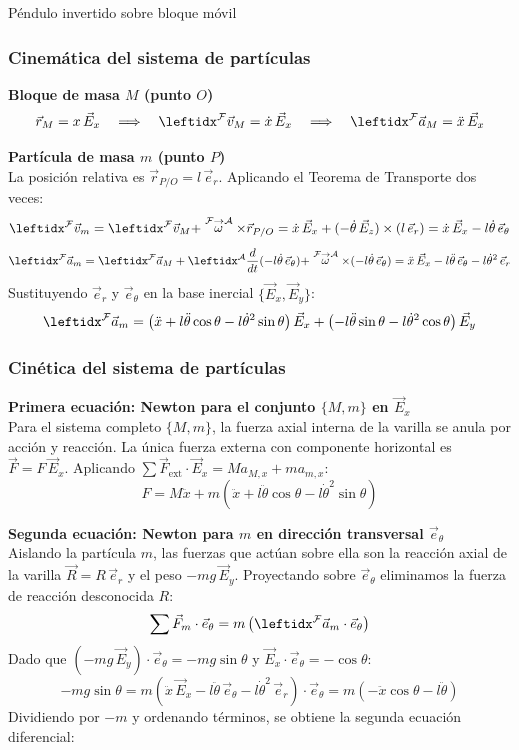 \begin{solucion}{Péndulo invertido sobre bloque móvil}
\subsubsection*{Cinemática del sistema de partículas}
\textbf{Bloque de masa $M$ (punto $O$)}
$$\vec{r}_M = x\,\vec{E}_x \quad\Longrightarrow\quad \marc{\vec{v}_M}{F} = \dot{x}\,\vec{E}_x \quad\Longrightarrow\quad \marc{\vec{a}_M}{F} = \ddot{x}\,\vec{E}_x$$

\textbf{Partícula de masa $m$ (punto $P$)}\\
La posición relativa es $\vec{r}_{P/O} = l\,\vec{e}_r$. Aplicando el Teorema de Transporte dos veces:
$$\marc{\vec{v}_m}{F} = \marc{\vec{v}_M}{F} + \velang{F}{A}\times\vec{r}_{P/O} = \dot{x}\,\vec{E}_x + (-\dot{\theta}\,\vec{E}_z) \times (l\,\vec{e}_r) = \dot{x}\,\vec{E}_x - l\dot{\theta}\,\vec{e}_\theta$$
$$\marc{\vec{a}_m}{F} = \marc{\vec{a}_M}{F} + \der{(-l\dot{\theta}\,\vec{e}_\theta)}{A}{} + \velang{F}{A} \times (-l\dot{\theta}\,\vec{e}_\theta) = \ddot{x}\,\vec{E}_x - l\ddot{\theta}\,\vec{e}_\theta - l\dot{\theta}^2\,\vec{e}_r$$
Sustituyendo $\vec{e}_r$ y $\vec{e}_\theta$ en la base inercial $\{\vec{E}_x, \vec{E}_y\}$:
$$\marc{\vec{a}_m}{F} = \left(\ddot{x} + l\ddot{\theta}\cos\theta - l\dot{\theta}^2\sin\theta\right)\vec{E}_x + \left(-l\ddot{\theta}\sin\theta - l\dot{\theta}^2\cos\theta\right)\vec{E}_y$$

\subsubsection*{Cinética del sistema de partículas}
\textbf{Primera ecuación: Newton para el conjunto $\{M, m\}$ en $\vec{E}_x$}\\
Para el sistema completo $\{M, m\}$, la fuerza axial interna de la varilla se anula por acción y reacción. La única fuerza externa con componente horizontal es $\vec{F} = F\,\vec{E}_x$. Aplicando $\sum \vec{F}_{\text{ext}} \cdot \vec{E}_x = M a_{M,x} + m a_{m,x}$:
$$F = M\ddot{x} + m\left(\ddot{x} + l\ddot{\theta}\cos\theta - l\dot{\theta}^2\sin\theta\right)$$

\textbf{Segunda ecuación: Newton para $m$ en dirección transversal $\vec{e}_\theta$}\\
Aislando la partícula $m$, las fuerzas que actúan sobre ella son la reacción axial de la varilla $\vec{R} = R\,\vec{e}_r$ y el peso $-mg\,\vec{E}_y$. Proyectando sobre $\vec{e}_\theta$ eliminamos la fuerza de reacción desconocida $R$:
$$\sum \vec{F}_m \cdot \vec{e}_\theta = m\left(\marc{\vec{a}_m}{F}\cdot \vec{e}_\theta\right)$$
Dado que $(-mg\,\vec{E}_y) \cdot \vec{e}_\theta = -mg\sin\theta$ y $\vec{E}_x \cdot \vec{e}_\theta = -\cos\theta$:
$$-mg\sin\theta = m\left(\ddot{x}\,\vec{E}_x - l\ddot{\theta}\,\vec{e}_\theta - l\dot{\theta}^2\,\vec{e}_r\right) \cdot \vec{e}_\theta = m\left(-\ddot{x}\cos\theta - l\ddot{\theta}\right)$$
Dividiendo por $-m$ y ordenando términos, se obtiene la segunda ecuación diferencial:


\end{solucion}
